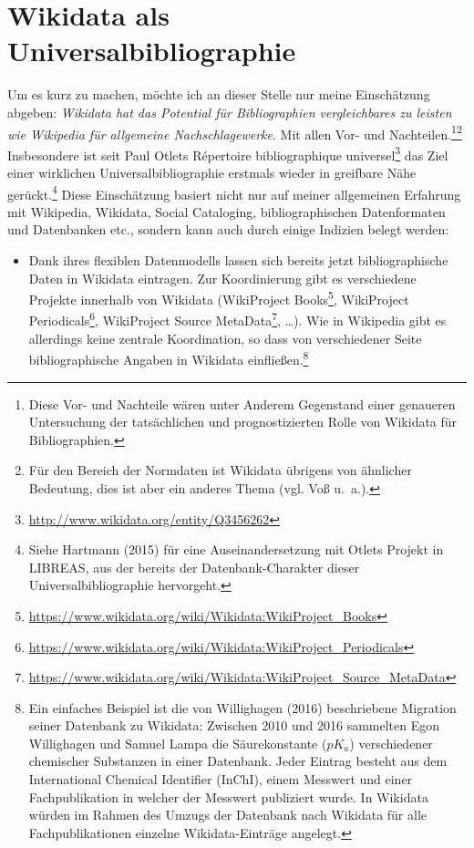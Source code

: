 \documentclass[a4paper,
fontsize=11pt,
oneside,
numbers=noperiodatend,
parskip=half-,
bibliography=totoc,
final
]{scrartcl}
\providecommand{\tightlist}{%
  \setlength{\itemsep}{0pt}\setlength{\parskip}{0pt}}
\begin{document}
\section*{Wikidata als
Universalbibliographie}\label{wikidata-als-universalbibliographie}

Um es kurz zu machen, möchte ich an dieser Stelle nur meine Einschätzung
abgeben: \emph{Wikidata hat das Potential für Bibliographien
vergleichbares zu leisten wie Wikipedia für allgemeine
Nachschlagewerke}. Mit allen Vor- und Nachteilen.\footnote{Diese Vor-
  und Nachteile wären unter Anderem Gegenstand einer genaueren
  Untersuchung der tatsächlichen und prognostizierten Rolle von Wikidata
  für Bibliographien.}\footnote{Für den Bereich der Normdaten ist
  Wikidata übrigens von ähnlicher Bedeutung, dies ist aber ein anderes
  Thema (vgl. Voß u.~a.).} Insbesondere ist seit Paul Otlets Répertoire
bibliographique universel\footnote{\url{http://www.wikidata.org/entity/Q3456262}}
das Ziel einer wirklichen Universalbibliographie erstmals wieder in
greifbare Nähe gerückt.\footnote{Siehe Hartmann (2015) für eine
  Auseinandersetzung mit Otlets Projekt in LIBREAS, aus der bereits der
  Datenbank-Charakter dieser Universalbibliographie hervorgeht.} Diese
Einschätzung basiert nicht nur auf meiner allgemeinen Erfahrung mit
Wikipedia, Wikidata, Social Cataloging, bibliographischen Datenformaten
und Datenbanken etc., sondern kann auch durch einige Indizien belegt
werden:

\begin{itemize}
\tightlist
\item
  Dank ihres flexiblen Datenmodells lassen sich bereits jetzt
  bibliographische Daten in Wikidata eintragen. Zur Koordinierung gibt
  es verschiedene Projekte innerhalb von Wikidata (WikiProject
  Books\footnote{\url{https://www.wikidata.org/wiki/Wikidata:WikiProject_Books}},
  WikiProject Periodicals\footnote{\url{https://www.wikidata.org/wiki/Wikidata:WikiProject_Periodicals}},
  WikiProject Source MetaData\footnote{\url{https://www.wikidata.org/wiki/Wikidata:WikiProject_Source_MetaData}},
  \ldots{}). Wie in Wikipedia gibt es allerdings keine zentrale
  Koordination, so dass von verschiedener Seite bibliographische Angaben
  in Wikidata einfließen.\footnote{Ein einfaches Beispiel ist die von
    Willighagen (2016) beschriebene Migration seiner Datenbank zu
    Wikidata: Zwischen 2010 und 2016 sammelten Egon Willighagen und
    Samuel Lampa die Säurekonstante (\(pK_a\)) verschiedener chemischer
    Substanzen in einer Datenbank. Jeder Eintrag besteht aus dem
    International Chemical Identifier (InChI), einem Messwert und einer
    Fachpublikation in welcher der Messwert publiziert wurde. In
    Wikidata würden im Rahmen des Umzugs der Datenbank nach Wikidata für
    alle Fachpublikationen einzelne Wikidata-Einträge angelegt.}
\end{itemize}
\end{document}
